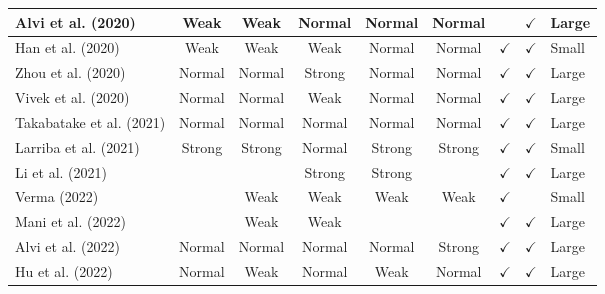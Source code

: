 \documentclass[../access.tex]{subfiles}
\begin{document}
\begin{table}[htbp]
\begin{adjustwidth}{-2cm}{}
\begin{tabular}{m{4.4cm} c c c c c c c >{\centering\arraybackslash}m{0.7cm}}
                    \hline
                    \footnotesize{Alvi et al. (2020) \cite{Alvi2020}} & {Weak} & {Weak} & {Normal} & {Normal} & {Normal} & {} & $ \checkmark $ & \footnotesize{Large} \\
                    \hline
                    \footnotesize{Han et al. (2020) \cite{Han2020}} & {Weak} & {Weak} & {Weak} & {Normal} & {Normal} & $ \checkmark $ & $ \checkmark $ & \footnotesize{Small} \\
                    \hline
                    \footnotesize{Zhou et al. (2020) \cite{Zhou2020}} & {Normal} & {Normal} & {Strong} & {Normal} & {Normal} & $ \checkmark $ & $ \checkmark $ & \footnotesize{Large} \\
                    \hline
                    \footnotesize{Vivek et al. (2020) \cite{Vivek2020}} & {Normal} & {Normal} & {Weak} & {Normal} & {Normal} & $ \checkmark $ & $ \checkmark $ & \footnotesize{Large} \\
                    \hline
                    \footnotesize{Takabatake et al. (2021) \cite{Takabatake2021}} & {Normal} & {Normal} & {Normal} & {Normal} & {Normal} & $ \checkmark $ & $ \checkmark $ & \footnotesize{Large} \\
                    \hline
                    \footnotesize{Larriba et al. (2021) \cite{Larriba2021}} & {Strong} & {Strong} & {Normal} & {Strong} & {Strong} & $ \checkmark $ & $ \checkmark $ & \footnotesize{Small} \\
                    \hline
                    \footnotesize{Li et al. (2021) \cite{Li2021}} & {} & {} & {Strong} & {Strong} & {} & $ \checkmark $ & $ \checkmark $ & \footnotesize{Large} \\
                    \hline
                    \footnotesize{Verma (2022) \cite{Verma2022}} & {} & {Weak} & {Weak} & {Weak} & {Weak} & $ \checkmark $ & {} & \footnotesize{Small} \\
                    \hline
                    \footnotesize{Mani et al. (2022) \cite{Mani2022}} & {} & {Weak} & {Weak} & {} & {} & $ \checkmark $ & $ \checkmark $ & \footnotesize{Large} \\
                    \hline
                    \footnotesize{Alvi et al. (2022) \cite{Alvi2022}} & {Normal} & {Normal} & {Normal} & {Normal} & {Strong} & $ \checkmark $ & $ \checkmark $ & \footnotesize{Large} \\
                    \hline
                    \footnotesize{Hu et al. (2022) \cite{Hu2022}} & {Normal} & {Weak} & {Normal} & {Weak} & {Normal} & $ \checkmark $ & $ \checkmark $ & \footnotesize{Large} \\

\end{tabular}
\end{adjustwidth}
\end{table}
\end{document}
